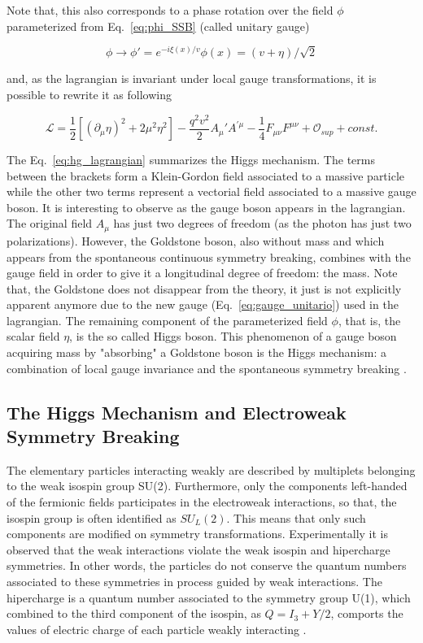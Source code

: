 Note that, this also corresponds to a phase rotation over the field $\phi$ parameterized from Eq.~\ref{eq:phi_SSB} (called unitary gauge)

\begin{equation}
\phi \rightarrow \phi' = e^{-i\xi(x)/v}\phi(x) = (v + \eta)/ \sqrt{2}
\label{eq:gauge_unitario}
\end{equation}

and, as the lagrangian is invariant under local gauge transformations, it is possible to rewrite it as following 

\begin{equation}
\mathcal{L} = \dfrac{1}{2}[(\partial_{\mu}\eta)^2 + 2\mu^2\eta^2] - \dfrac{q^2v^2}{2}A_{\mu}'A^{'\mu} - \dfrac{1}{4}F_{\mu\nu}F^{\mu\nu} + \mathcal{O}_{sup} + const.
\label{eq:hg_lagrangian}
\end{equation}

The Eq.~\ref{eq:hg_lagrangian} summarizes the Higgs mechanism. The terms between the brackets form a Klein-Gordon field associated to a massive particle while the other two terms represent a vectorial field associated to a massive gauge boson. It is interesting to observe as the gauge boson appears in the lagrangian. The original field $A_{\mu}$ has just two degrees of freedom (as the photon has just two polarizations). However, the Goldstone boson, also without mass and which appears from the spontaneous continuous symmetry breaking, combines with the gauge field in order to give it a longitudinal degree of freedom: the mass. Note that, the Goldstone does not disappear from the theory, it just is not explicitly apparent anymore due to the new gauge (Eq.~\ref{eq:gauge_unitario}) used in the lagrangian. The remaining component of the parameterized field $\phi$, that is, the scalar field $\eta$, is the so called Higgs boson. This phenomenon of a gauge boson acquiring mass by "absorbing" a Goldstone boson is the Higgs mechanism: a combination of local gauge invariance and the spontaneous symmetry breaking \cite{bib:griffiths-2008,bib:halzen-martin-1984,bib:quigg-1983,bib:das-2008}.


\subsection{The Higgs Mechanism and Electroweak Symmetry Breaking}
The elementary particles interacting weakly are described by multiplets belonging to the weak isospin group SU(2). Furthermore, only the components left-handed of the fermionic fields participates in the electroweak interactions, so that, the isospin group is often identified as $SU_{L}(2)$. This means that only such components are modified on symmetry transformations. Experimentally it is observed that the weak interactions violate the weak isospin and hipercharge symmetries. In other words, the particles do not conserve the quantum numbers associated to these symmetries in process guided by weak interactions. The hipercharge is a quantum number associated to the symmetry group U(1), which combined to the third component of the isospin, as $Q = I_3 + Y/2$, comports the values of electric charge of each particle weakly interacting \cite{bib:das-2008,bib:seiden-2008}. 

